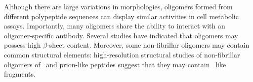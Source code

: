 Although there are large variations in morphologies, oligomers formed from different polypeptide sequences can display similar activities in cell metabolic assays.\cite{Bucciantini:2002un} Importantly, many oligomers share the ability to interact with an oligomer-specific antibody.\cite{Kayed:2003en,Glabe:2008p130} %
Several studies have indicated that oligomers may possess high $\beta$-sheet content.\cite{Chimon:2007du,Ahmed:2010p5694,Campioni:2010hz} %
Moreover, some non-fibrillar oligomers may contain common structural elements: high-resolution structural studies of non-fibrillar oligomers of \ and prion-like peptides suggest that they may contain \crossb\ like fragments.\cite{Walsh:2010p4761,Stroud:2012dp,Chimon:2007du}
 



